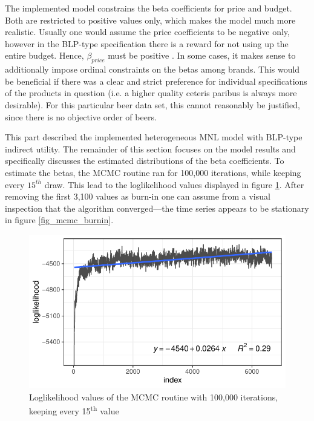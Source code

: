\documentclass[12pt,a4paper]{article}
\begin{document}
The implemented model constrains the beta coefficients for price and budget.
Both are restricted to positive values only, which makes the model much more realistic.
Usually one would assume the price coefficients to be negative only, however in the BLP-type specification there is a reward for not using up the entire budget. Hence, $\beta_{price}$ must be positive \citep{pachaliPerilsIgnoringBudget2017}.
In some cases, it makes sense to additionally impose ordinal constraints on the betas among brands.
This would be beneficial if there was a clear and strict preference for individual specifications of the products in question (i.e. a higher quality ceteris paribus is always more desirable).
For this particular beer data set, this cannot reasonably be justified, since there is no objective order of beers.

This part described the implemented heterogeneous MNL model with BLP-type indirect utility.
The remainder of this section focuses on the model results and specifically discusses the estimated distributions of the beta coefficients.
To estimate the betas, the MCMC routine ran for 100,000 iterations, while keeping every $15^{th}$ draw.
This lead to the loglikelihood values displayed in figure \ref{fig_mcmc}.
After removing the first 3,100 values as burn-in one can assume from a visual inspection that the algorithm converged---the time series appears to be stationary in figure \ref{fig_mcmc_burnin}.

\begin{figure}[ht]
	\centering
  \includegraphics[scale = 0.8]{figures/mcmc_before_burnin_fitted.pdf}
	\caption{Loglikelihood values of the MCMC routine with 100,000 iterations, keeping every 15\textsuperscript{th} value}
	\label{fig_mcmc}
\end{figure}
\end{document}
